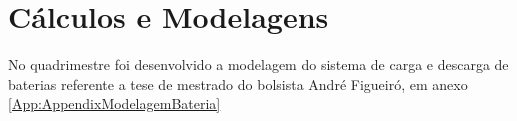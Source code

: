 
\setcounter{secnumdepth}{3}
\section{Cálculos e Modelagens}
\label{calculos_e_modelagens}

No quadrimestre foi desenvolvido a modelagem do sistema de carga e descarga de baterias referente a tese de mestrado do bolsista André Figueiró, em anexo \ref{App:AppendixModelagemBateria}  
